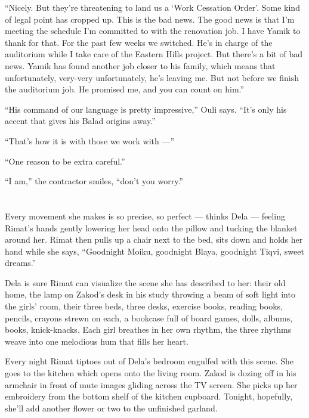 \documentclass[twoside,11pt,openany]{book}
\begin{document}
``Nicely. But they're threatening to land us a `Work Cessation Order'. Some kind of legal point has cropped
up. This is the bad news. The good news is that I'm meeting the schedule I'm committed to with the renovation job.  I
have Yamik to thank for that. For the past few weeks we switched. He's in charge of the auditorium while I take care of
the Eastern Hills project. But there's a bit of bad news. Yamik has found another job closer to his family, which means
that unfortunately, very-very unfortunately, he's leaving me. But not before we finish the auditorium job. He
promised me, and you can count on him.''

``His command of our language is pretty impressive,'' Ouli says. ``It's only his
accent that gives his Balad origins away.''

``That's how it is with those we work with ---''

``One reason to be extra careful.''

``I am,'' the contractor smiles, ``don't you worry.''



\chapter{}

Every movement she makes is so precise, so perfect --- thinks Dela --- feeling Rimat's hands gently lowering her head onto
the pillow and tucking the blanket around her. Rimat then pulls up a chair next to the bed, sits down and holds her
hand while she says, ``Goodnight Moiku, goodnight Blaya, goodnight Tiqvi, sweet dreams.''

Dela is sure Rimat can visualize the scene she has described to her: their old home, the lamp on Zakod's desk in his
study throwing a beam of soft light into the girls{'} room, their three beds, three desks, exercise books, reading
books, pencils, crayons strewn on each, a bookcase full of board games, dolls, albums, books, knick-knacks. Each girl
breathes in her own rhythm, the three rhythms weave into one melodious hum that fills her heart.

Every night Rimat tiptoes out of Dela's bedroom engulfed with this scene. She goes to the kitchen which opens onto the
living room.  Zakod is dozing off in his armchair in front of mute images gliding across the TV screen. She picks up
her embroidery from the bottom shelf of the kitchen cupboard. Tonight, hopefully, she'll add another flower or two to
the unfinished garland.
\end{document}
